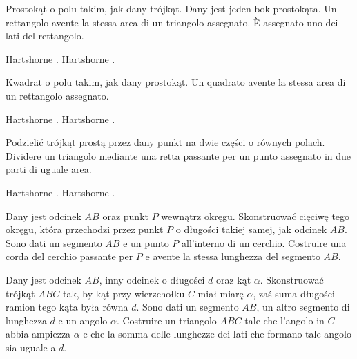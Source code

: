 \begin{problem}
    Prostokąt o polu takim, jak dany trójkąt. %
    Dany jest jeden bok prostokąta. %
    Un rettangolo avente la stessa area di un triangolo assegnato. %
    È assegnato uno dei lati del rettangolo. %
\end{problem}

Hartshorne \cite[s. 43]{hartshorne_2000}. %
Hartshorne \cite[p. 43]{hartshorne_2000}. %

\begin{problem}
    Kwadrat o polu takim, jak dany prostokąt. %
    Un quadrato avente la stessa area di un rettangolo assegnato. %
\end{problem}

Hartshorne \cite[s. 43]{hartshorne_2000}. %
Hartshorne \cite[p. 43]{hartshorne_2000}. %

\begin{problem}
    Podzielić trójkąt prostą przez dany punkt na dwie części o równych polach. %
    Dividere un triangolo mediante una retta passante per un punto assegnato in due parti di uguale area. %
\end{problem}

Hartshorne \cite[s. 44]{hartshorne_2000}. %
Hartshorne \cite[p. 44]{hartshorne_2000}. %

\begin{problem}
    Dany jest odcinek $AB$ oraz punkt $P$ wewnątrz okręgu. %
    Skonstruować cięciwę tego okręgu, która przechodzi przez punkt $P$ o długości takiej samej, jak odcinek $AB$. %
    Sono dati un segmento $AB$ e un punto $P$ all'interno di un cerchio. %
    Costruire una corda del cerchio passante per $P$ e avente la stessa lunghezza del segmento $AB$. %
\end{problem}

\begin{problem}
    Dany jest odcinek $AB$, inny odcinek o długości $d$ oraz kąt $\alpha$. %
    Skonstruować trójkąt $ABC$ tak, by kąt przy wierzchołku $C$ miał miarę $\alpha$, zaś suma długości ramion tego kąta była równa $d$. %
    Sono dati un segmento $AB$, un altro segmento di lunghezza $d$ e un angolo $\alpha$. %
    Costruire un triangolo $ABC$ tale che l'angolo in $C$ abbia ampiezza $\alpha$ e che la somma delle lunghezze dei lati che formano tale angolo sia uguale a $d$. %
\end{problem}

